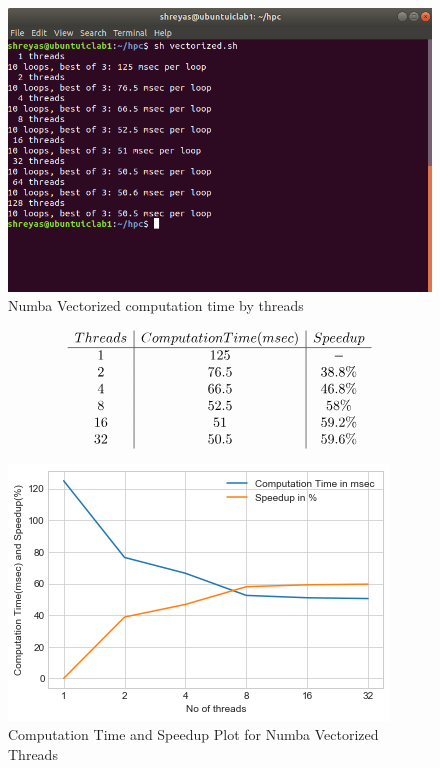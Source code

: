 \documentclass{article}
\begin{document}
\begin{figure}[h!]
    \centering
    \includegraphics[scale=0.4]{threads_vectorized.png}
    \caption{Numba Vectorized computation time by threads}
    \label{fig:numba_vec}
\end{figure}

\begin{align}
    \begin{array}{c | c | c}
         Threads  & Computation Time(msec) & Speedup \\ 
         \hline %
         1   & 125 & - \\
         2   & 76.5 &  38.8\%  \\
         4   & 66.5 & 46.8\% \\
         8   & 52.5 & 58\% \\
         16   & 51 & 59.2\% \\
         32   & 50.5 & 59.6\% \\
    \end{array}
\end{align}

\begin{figure}
    \centering
    \includegraphics{speedup_plot.png}
    \caption{Computation Time and Speedup Plot for Numba Vectorized Threads}
    \label{fig:my_label}
\end{figure}
\end{document}

